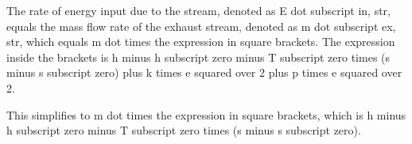 The rate of energy input due to the stream, denoted as E dot subscript in, str, equals the mass flow rate of the exhaust stream, denoted as m dot subscript ex, str, which equals m dot times the expression in square brackets. The expression inside the brackets is h minus h subscript zero minus T subscript zero times (s minus s subscript zero) plus k times e squared over 2 plus p times e squared over 2.

This simplifies to m dot times the expression in square brackets, which is h minus h subscript zero minus T subscript zero times (s minus s subscript zero).